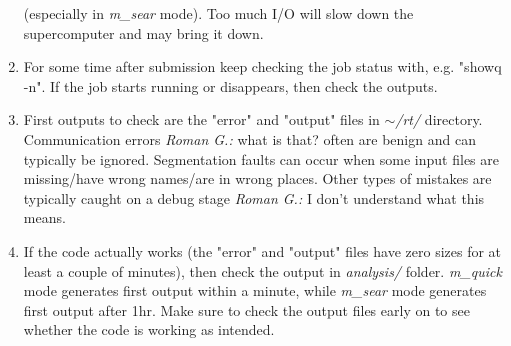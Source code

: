 \documentclass{emulateapj}
\newcommand{\rg}[1]{\color{blue}\textit{Roman G.:} #1\color{black}}
\begin{document}
\begin{enumerate}
{  (especially in \textit{m\_sear} mode).  Too much I/O will slow down
  the supercomputer and may bring it down.}
\item{For some time after submission keep checking the job status
  with, e.g. "showq -n". If the job starts running or disappears, then
  check the outputs.}
\item{First outputs to check are the "error" and "output" files in
  \textit{$\sim$/rt/} directory. Communication errors \rg{what is
    that?} often are benign and can typically be ignored.
  Segmentation faults can occur when some input files are missing/have
  wrong names/are in wrong places.  Other types of mistakes are
  typically caught on a debug stage \rg{I don't understand what this means}.}
\item{If the code actually works (the "error" and "output" files have
  zero sizes for at least a couple of minutes), then check the output
  in \textit{analysis/} folder.  \textit{m\_quick} mode generates
  first output within a minute, while \textit{m\_sear} mode generates
  first output after 1hr. Make sure to check the output files early on
  to see whether the code is working as intended.}
\end{enumerate}
\end{document}
